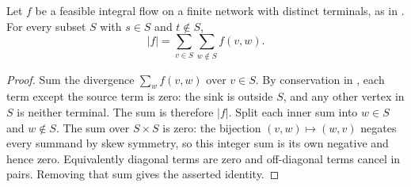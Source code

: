 \begin{lemma}
Let $f$ be a feasible integral flow on a finite network with distinct
terminals, as in . For every subset $S$ with
$s\in S$ and $t\notin S$,
\[
 |f|=\sum_{v\in S}\sum_{w\notin S} f(v,w).
\]
\end{lemma}
\begin{proof}
Sum the divergence $\sum_w f(v,w)$ over $v\in S$. By conservation in
, each term except the source term is zero:
the sink is outside $S$, and any other vertex in $S$ is neither terminal.
The sum is therefore $|f|$. Split each inner sum into $w\in S$ and
$w\notin S$. The sum over $S\times S$ is zero: the bijection
$(v,w)\mapsto(w,v)$ negates every summand by skew symmetry, so this
integer sum is its own negative and hence zero. Equivalently diagonal
terms are zero and off-diagonal terms cancel in pairs. Removing that
sum gives the asserted identity.
\end{proof}
